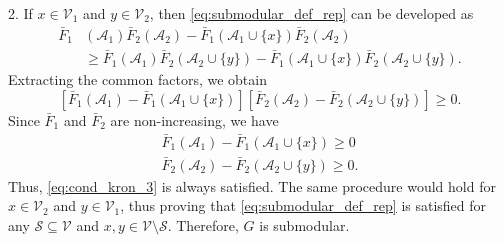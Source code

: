 \documentclass{article}
\begin{document}
2. If $x\in\mathcal{V}_1$ and $y\in\mathcal{V}_2$, then \eqref{eq:submodular_def_rep} can be developed as
  \begin{align*}
    \bar{F}_1&(\mathcal{A}_1)\bar{F}_2(\mathcal{A}_2)-\bar{F}_1(\mathcal{A}_1\cup\{x\})\bar{F}_2(\mathcal{A}_2)\\
    &\geq \bar{F}_1(\mathcal{A}_1)\bar{F}_2(\mathcal{A}_2\cup\{y\})- \bar{F}_1(\mathcal{A}_1\cup\{x\})\bar{F}_2(\mathcal{A}_2\cup\{y\}).
  \end{align*}
  Extracting the common factors, we obtain
  \begin{equation}
    \left[\bar{F}_1(\mathcal{A}_1)-\bar{F}_1(\mathcal{A}_1\cup\{x\})\right]\left[\bar{F}_2(\mathcal{A}_2)-\bar{F}_2(\mathcal{A}_2\cup\{y\})\right]\geq 0.\label{eq:cond_kron_3}
  \end{equation}
  Since $\bar{F}_1$ and $\bar{F}_2$ are non-increasing, we have 
  \begin{gather*}
    \bar{F}_1(\mathcal{A}_1)-\bar{F}_1(\mathcal{A}_1\cup\{x\})\geq 0\\
    \bar{F}_2(\mathcal{A}_2)-\bar{F}_2(\mathcal{A}_2\cup\{y\})\geq 0.
  \end{gather*}
  Thus, \eqref{eq:cond_kron_3} is always satisfied. The same procedure would hold for $x\in\mathcal{V}_2$ and $y\in\mathcal{V}_1$, thus proving that \eqref{eq:submodular_def_rep} is satisfied for any $\mathcal{S}\subseteq\mathcal{V}$ and $x,y\in\mathcal{V}\setminus\mathcal{S}$. Therefore, $G$ is submodular.
\newpage



\end{document}
